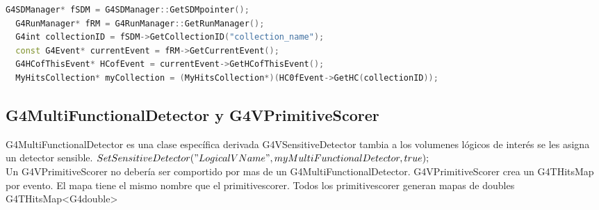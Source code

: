 \documentclass[10pt,a4paper,oneside]{book}
\begin{document}
\begin{lstlisting}[language=C++, frame = single]
     G4SDManager* fSDM = G4SDManager::GetSDMpointer();
  G4RunManager* fRM = G4RunManager::GetRunManager();
  G4int collectionID = fSDM->GetCollectionID("collection_name");
  const G4Event* currentEvent = fRM->GetCurrentEvent();
  G4HCofThisEvent* HCofEvent = currentEvent->GetHCofThisEvent();
  MyHitsCollection* myCollection = (MyHitsCollection*)(HC0fEvent->GetHC(collectionID));
\end{lstlisting}


\subsection*{G4MultiFunctionalDetector y G4VPrimitiveScorer}
G4MultiFunctionalDetector es una clase específica derivada
G4VSensitiveDetector tambia a los volumenes lógicos de interés se les
asigna un detector sensible.
$ SetSensitiveDetector("LogicalV Name", myMultiFunctionalDetector ,
true);$
\\
Un G4VPrimitiveScorer no debería ser comportido por mas de un
G4MultiFunctionalDetector. G4VPrimitiveScorer crea un G4THitsMap por
evento. El mapa tiene el mismo nombre que el primitivescorer. Todos
los primitivescorer generan mapas de doubles G4THitsMap<G4double>
\end{document}
